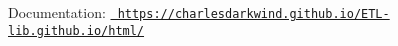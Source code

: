Documentation\+: \href{https://charlesdarkwind.github.io/ETL-lib.github.io/html/}{\texttt{ https\+://charlesdarkwind.\+github.\+io/\+E\+T\+L-\/lib.\+github.\+io/html/}} 